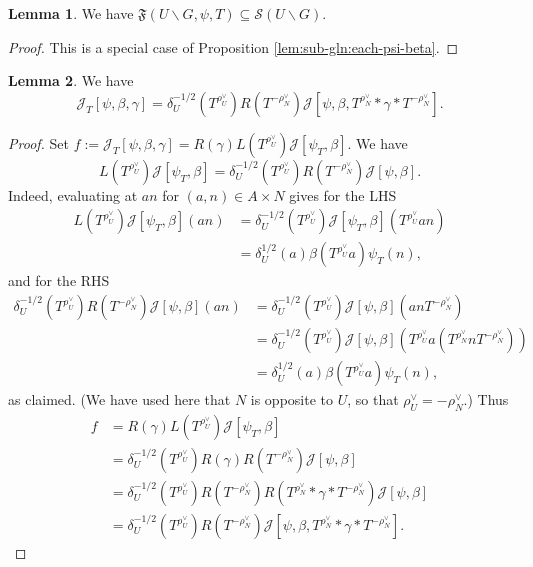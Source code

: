 \documentclass[reqno]{amsart}
\theoremstyle{plain} \newtheorem{theorem} {Theorem}
\theoremstyle{definition} \newtheorem{definition} [theorem] {Definition}
\theoremstyle{itplain} %
\newtheorem{lemma}[theorem]{Lemma}
\numberwithin{equation}{section}
\numberwithin{theorem}{section}
\begin{document}
\begin{lemma}\label{lem:standard2:mathfr-backsl-g}
  We have $\mathfrak{F}(U \backslash G, \psi, T) \subseteq \mathcal{S}(U \backslash G)$.
\end{lemma}
\begin{proof}
  This is a special case of Proposition \ref{lem:sub-gln:each-psi-beta}.
\end{proof}

\begin{lemma}\label{lem:cal-J-T-vs-cal-J}
  We have
  \begin{equation*}
    \mathcal{J}_T[\psi,\beta,\gamma] =  \delta_U^{-1/2}(T^{\rho_U^\vee}) R(T^{-\rho_N^\vee}) \mathcal{J}[\psi,\beta, T^{\rho_N^\vee} \ast \gamma \ast T ^{- \rho_N^\vee }].
  \end{equation*}
\end{lemma}
\begin{proof}
  Set $f := \mathcal{J}_T[\psi,\beta,\gamma] = R(\gamma) L(T ^{\rho_U^\vee }) \mathcal{J}[\psi_T,\beta]$.  We have
  \begin{equation*}
    L(T^{\rho_U^\vee}) \mathcal{J}[\psi_T,\beta] = \delta_U^{-1/2}(T^{\rho_U^\vee}) R(T^{-\rho_N^\vee}) \mathcal{J}[\psi,\beta].
  \end{equation*}
  Indeed, evaluating at $a n$ for $(a,n) \in A \times N$ gives for the LHS
  \begin{align*}
    L(T^{\rho_U^\vee}) \mathcal{J}[\psi_T,\beta](a n) &=
    \delta_U^{-1/2}(T^{\rho_U^\vee})  \mathcal{J}[\psi_T,\beta](T^{\rho_U^\vee} a n) \\
    &=
    \delta_U^{1/2}(a) \beta(T^{\rho_U^\vee} a) \psi_T(n),
  \end{align*}
  and for the RHS
  \begin{align*}
        \delta_U^{-1/2}(T^{\rho_U^\vee})  R(T^{-\rho_N^\vee}) \mathcal{J}[\psi,\beta](a n)
    &=
        \delta_U^{-1/2}(T^{\rho_U^\vee})  \mathcal{J}[{\psi,\beta}](a n T^{-\rho_N^\vee}) \\
    &=
          \delta_U^{-1/2}(T^{\rho_U^\vee})   \mathcal{J}[{\psi,\beta}](T^{\rho_U^\vee} a (T^{\rho_N^\vee} n T^{-\rho_N^\vee})) \\
    &=
    \delta_U^{1/2}(a) \beta(T^{\rho_U^\vee} a) \psi_T(n),
  \end{align*}
  as claimed.  (We have used here that $N$ is opposite to $U$, so that $\rho_U^\vee = - \rho_N^\vee$.)  Thus
  \begin{align*}
    f &=
         R(\gamma)     L(T^{\rho_U^\vee}) \mathcal{J}[\psi_T,\beta] \\
      &= \delta_U^{-1/2}(T^{\rho_U^\vee}) R(\gamma) R(T^{-\rho_N^\vee}) \mathcal{J}[\psi,\beta] \\
      &= \delta_U^{-1/2}(T^{\rho_U^\vee}) R(T^{-\rho_N^\vee}) R(T^{\rho_N^\vee} \ast \gamma \ast T ^{- \rho_N^\vee }) \mathcal{J}[\psi,\beta] \\
      &= \delta_U^{-1/2}(T^{\rho_U^\vee}) R(T^{-\rho_N^\vee}) \mathcal{J}[\psi,\beta,  T^{\rho_N^\vee} \ast \gamma \ast T ^{- \rho_N^\vee }].
  \end{align*}
\end{proof}
\end{document}
